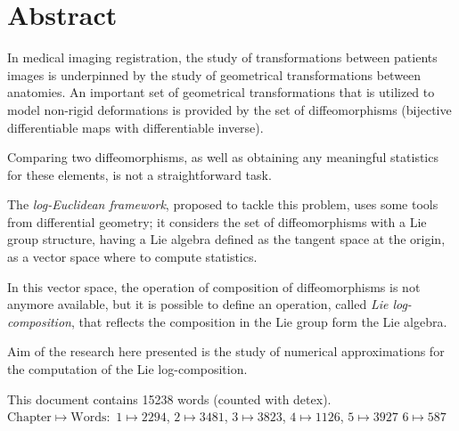 \section*{Abstract}


In medical imaging registration, the study of transformations between patients images is underpinned by the study of geometrical transformations between anatomies. An important set of geometrical transformations that is utilized to model non-rigid deformations is provided by the set of diffeomorphisms (bijective differentiable maps with differentiable inverse).

Comparing two diffeomorphisms, as well as obtaining any meaningful statistics for these elements, is not a straightforward task.

The \emph{log-Euclidean framework}, proposed to tackle this problem, uses some tools from differential geometry; it considers the set of diffeomorphisms with a Lie group structure, having a Lie algebra defined as the tangent space at the origin, as a vector space where to compute statistics.

In this vector space, the operation of composition of diffeomorphisms is not anymore available, but it is possible to define an operation, called \emph{Lie log-composition}, that reflects the composition in the Lie group form the Lie algebra.

Aim of the research here presented is the study of numerical approximations for the computation of the Lie log-composition. 


\vspace{1cm}

\noindent
This document contains 15238 words (counted with detex).\\
$ \text{Chapter} \mapsto \text{Words}:$ 
$1 \mapsto 2294$,
$2 \mapsto 3481 $,
$3 \mapsto 3823 $,
$4 \mapsto 1126 $,
$5 \mapsto 3927$
$6 \mapsto 587$

\qquad
\pagestyle{empty}
\newpage

\qquad
\pagestyle{empty}
\newpage
